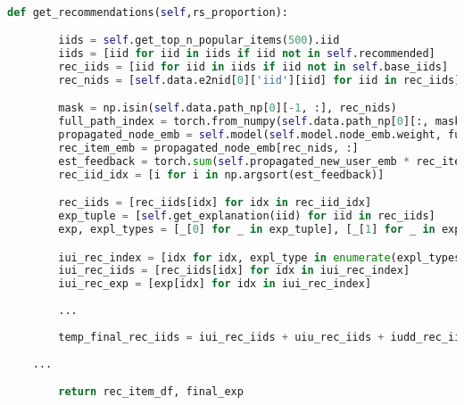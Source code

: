 \begin{lstlisting}[language=Python, caption=get\_recommendation]

def get_recommendations(self,rs_proportion):

        iids = self.get_top_n_popular_items(500).iid
        iids = [iid for iid in iids if iid not in self.recommended]
        rec_iids = [iid for iid in iids if iid not in self.base_iids]
        rec_nids = [self.data.e2nid[0]['iid'][iid] for iid in rec_iids]

        mask = np.isin(self.data.path_np[0][-1, :], rec_nids)
        full_path_index = torch.from_numpy(self.data.path_np[0][:, mask]).to(self.device_args['device'])
        propagated_node_emb = self.model(self.model.node_emb.weight, full_path_index)[0]
        rec_item_emb = propagated_node_emb[rec_nids, :]
        est_feedback = torch.sum(self.propagated_new_user_emb * rec_item_emb, dim=1).reshape(-1).cpu().detach().numpy()
        rec_iid_idx = [i for i in np.argsort(est_feedback)]

        rec_iids = [rec_iids[idx] for idx in rec_iid_idx]
        exp_tuple = [self.get_explanation(iid) for iid in rec_iids]
        exp, expl_types = [_[0] for _ in exp_tuple], [_[1] for _ in exp_tuple]

        iui_rec_index = [idx for idx, expl_type in enumerate(expl_types) if expl_type == 'IUI'][:rs_proportion['IUI']]
        iui_rec_iids = [rec_iids[idx] for idx in iui_rec_index]
        iui_rec_exp = [exp[idx] for idx in iui_rec_index]
        
        ...
        
        temp_final_rec_iids = iui_rec_iids + uiu_rec_iids + iudd_rec_iids + uicc_rec_iids
	
	...

        return rec_item_df, final_exp

\end{lstlisting}

